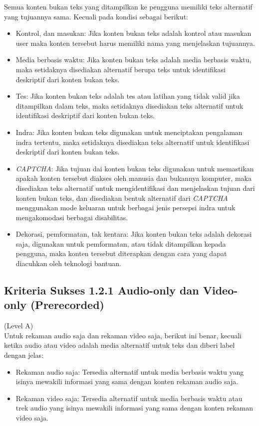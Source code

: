 Semua konten bukan teks yang ditampilkan ke pengguna memiliki teks alternatif yang tujuannya sama. Kecuali pada kondisi sebagai berikut:

\begin{itemize}
	\item Kontrol, dan masukan: Jika konten bukan teks adalah kontrol atau masukan user maka konten tersebut harus memiliki nama yang menjelaskan tujuannya.
	\item Media berbasis waktu: Jika konten bukan teks adalah media berbasis waktu, maka setidaknya disediakan alternatif berupa teks untuk identifikasi deskriptif dari konten bukan teks.
	\item Tes: Jika konten bukan teks adalah tes atau latihan yang tidak valid jika ditampilkan dalam teks, maka setidaknya disediakan teks alternatif untuk identifikasi deskriptif dari konten bukan teks.
	\item Indra: Jika konten bukan teks digunakan untuk menciptakan pengalaman indra tertentu, maka setidaknya disediakan teks alternatif untuk identifikasi deskriptif dari konten bukan teks.
	\item \textit{CAPTCHA}: Jika tujuan dai konten bukan teks digunakan untuk memastikan apakah konten tersebut diakses oleh manusia dan bukannya komputer, maka disediakan teks alternatif untuk mengidentifikasi dan menjelaskan tujuan dari konten bukan teks, dan disediakan bentuk alternatif dari \textit{CAPTCHA} menggunakan mode keluaran untuk berbagai jenis persepsi indra untuk mengakomodasi berbagai disabilitas.
	\item Dekorasi, pemformatan, tak kentara: Jika konten bukan teks adalah dekorasi saja, digunakan untuk pemformatan, atau tidak ditampilkan kepada pengguna, maka konten tersebut diterapkan dengan cara yang dapat diacuhkan oleh teknologi bantuan.
\end{itemize} 

\subsection{Kriteria Sukses 1.2.1 Audio-only dan Video-only (Prerecorded)}
\label{subsec:kriteria_1.2.1}
(Level A) \\

Untuk rekaman audio saja dan rekaman video saja, berikut ini benar, kecuali ketika audio atau video adalah media alternatif untuk teks dan diberi label dengan jelas: 
\begin{itemize}
	\item Rekaman audio saja: Tersedia alternatif untuk media berbasis waktu yang isinya mewakili informasi yang sama dengan konten rekaman audio saja.
	\item Rekaman video saja: Tersedia alternatif untuk media berbasis waktu atau trek audio yang isinya mewakili informasi yang sama dengan konten rekaman video saja.
\end{itemize}

